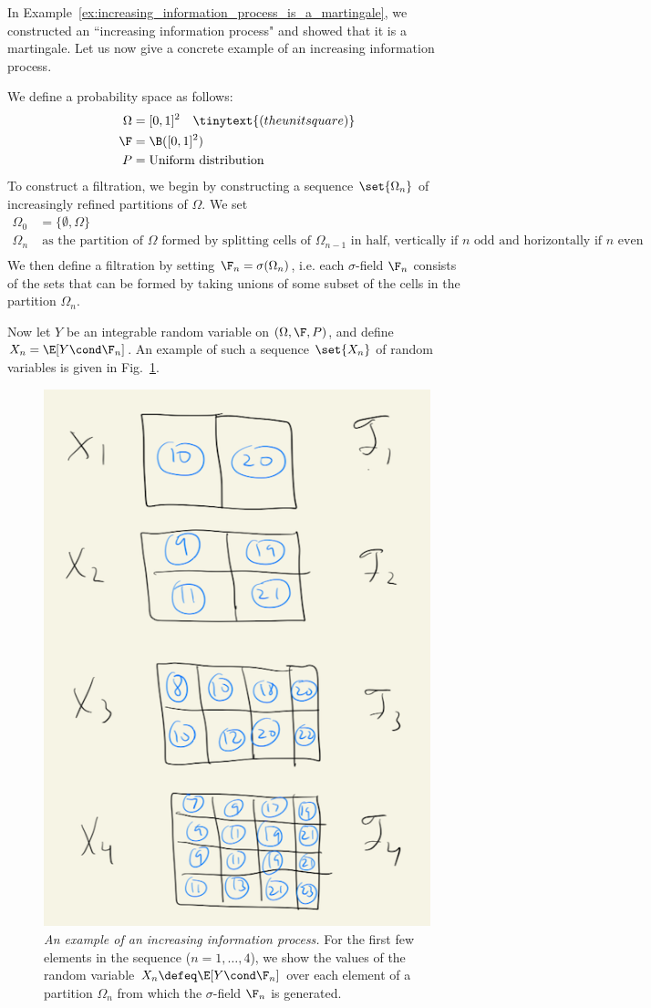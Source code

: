 \documentclass{article} %
\begin{document}
\begin{remark} 
In Example~\ref{ex:increasing_information_process_is_a_martingale}, we constructed an ``increasing information process" and showed that it is a martingale.  Let us now give a concrete example of an increasing information process. 

We define a probability space as follows:
%
\begin{align*}
\Omega &= [0,1]^2 \quad \tinytext{(the unit square)} \\
\F &= \B([0,1]^2) \\
P &= \text{Uniform distribution}
\end{align*}
%
To construct a filtration, we begin by constructing a sequence $\set{\Omega_n}$ of increasingly refined partitions of $\Omega$. We set
%
\begin{align*}
\Omega_0 &= \bigg\{ \emptyset, \Omega \bigg\} \\
\Omega_n & \; \text{as the partition of $\Omega$ formed by splitting cells of $\Omega_{n-1}$ in half, vertically if $n$ odd and horizontally if $n$ even} \\
\end{align*} 	
%
We then define a filtration by setting $\F_n = \sigma(\Omega_n)$, i.e. each $\sigma$-field $\F_n$ consists of the sets that can be formed by taking unions of some subset of the cells in the partition $\Omega_n$.  

Now let $Y$ be an integrable random variable on $(\Omega, \F, P)$, and define $X_n = \E[Y \cond \F_n]$.  An example of such a sequence $\set{X_n}$ of random variables is given in Fig.~\ref{fig:example_of_increasing_information_process}.

\begin{figure}[H]
\centering
\includegraphics[width=.5\textwidth]{images/example_of_increasing_information_process.png}	
\caption{ \textit{An example of an increasing information process.}  For the first few elements in the sequence ($n=1,\hdots,4$), we show the values of the random variable $X_n \defeq \E[Y \cond \F_n]$ over each element of a partition $\Omega_n$ from which the $\sigma$-field $\F_n$ is generated.}
\label{fig:example_of_increasing_information_process}
\end{figure}


\end{remark}
\end{document}
